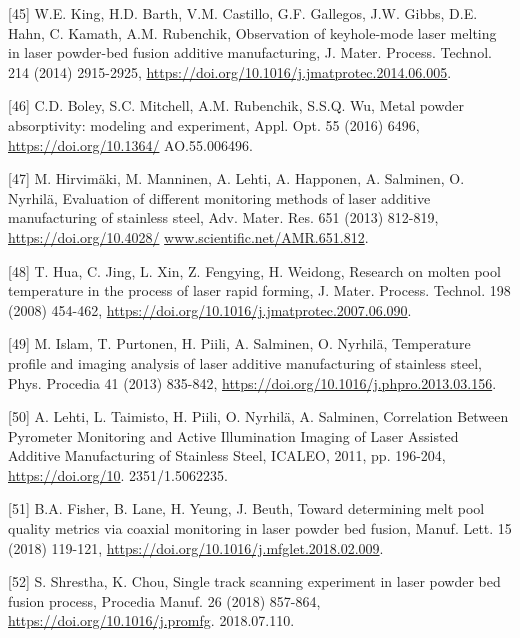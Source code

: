 \documentclass[10pt]{article}
\begin{document}
[45] W.E. King, H.D. Barth, V.M. Castillo, G.F. Gallegos, J.W. Gibbs, D.E. Hahn, C. Kamath, A.M. Rubenchik, Observation of keyhole-mode laser melting in laser powder-bed fusion additive manufacturing, J. Mater. Process. Technol. 214 (2014) 2915-2925, \href{https://doi.org/10.1016/j.jmatprotec.2014.06.005}{https://doi.org/10.1016/j.jmatprotec.2014.06.005}.

[46] C.D. Boley, S.C. Mitchell, A.M. Rubenchik, S.S.Q. Wu, Metal powder absorptivity: modeling and experiment, Appl. Opt. 55 (2016) 6496, \href{https://doi.org/10.1364/}{https://doi.org/10.1364/} AO.55.006496.

[47] M. Hirvimäki, M. Manninen, A. Lehti, A. Happonen, A. Salminen, O. Nyrhilä, Evaluation of different monitoring methods of laser additive manufacturing of stainless steel, Adv. Mater. Res. 651 (2013) 812-819, \href{https://doi.org/10.4028/}{https://doi.org/10.4028/} \href{http://www.scientific.net/AMR.651.812}{www.scientific.net/AMR.651.812}.

[48] T. Hua, C. Jing, L. Xin, Z. Fengying, H. Weidong, Research on molten pool temperature in the process of laser rapid forming, J. Mater. Process. Technol. 198\\
(2008) 454-462, \href{https://doi.org/10.1016/j.jmatprotec.2007.06.090}{https://doi.org/10.1016/j.jmatprotec.2007.06.090}.

[49] M. Islam, T. Purtonen, H. Piili, A. Salminen, O. Nyrhilä, Temperature profile and imaging analysis of laser additive manufacturing of stainless steel, Phys. Procedia 41 (2013) 835-842, \href{https://doi.org/10.1016/j.phpro.2013.03.156}{https://doi.org/10.1016/j.phpro.2013.03.156}.

[50] A. Lehti, L. Taimisto, H. Piili, O. Nyrhilä, A. Salminen, Correlation Between Pyrometer Monitoring and Active Illumination Imaging of Laser Assisted Additive Manufacturing of Stainless Steel, ICALEO, 2011, pp. 196-204, \href{https://doi.org/10}{https://doi.org/10}. 2351/1.5062235.

[51] B.A. Fisher, B. Lane, H. Yeung, J. Beuth, Toward determining melt pool quality metrics via coaxial monitoring in laser powder bed fusion, Manuf. Lett. 15 (2018) 119-121, \href{https://doi.org/10.1016/j.mfglet.2018.02.009}{https://doi.org/10.1016/j.mfglet.2018.02.009}.

[52] S. Shrestha, K. Chou, Single track scanning experiment in laser powder bed fusion process, Procedia Manuf. 26 (2018) 857-864, \href{https://doi.org/10.1016/j.promfg}{https://doi.org/10.1016/j.promfg}. 2018.07.110.
\end{document}
